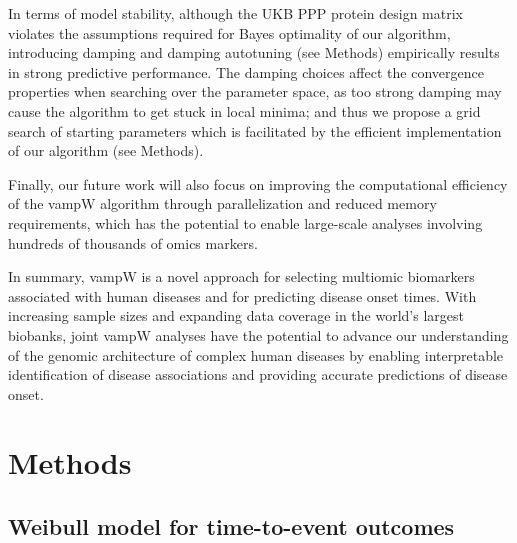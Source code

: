 In terms of model stability, although the UKB PPP protein design matrix violates the assumptions required for Bayes optimality of our algorithm, introducing damping and damping autotuning (see Methods) empirically results in strong predictive performance. The damping choices affect the convergence properties when searching over the parameter space, as too strong damping may cause the algorithm to get stuck in local minima; and thus we propose a grid search of starting parameters which is facilitated by the efficient implementation of our algorithm (see Methods). 



Finally, our future work will also focus on improving the computational efficiency of the vampW algorithm through parallelization and reduced memory requirements, which has the potential to enable large-scale analyses involving hundreds of thousands of omics markers.  

In summary, vampW is a novel approach for selecting multiomic biomarkers associated with human diseases and for predicting disease onset times. With increasing sample sizes and expanding data coverage in the world’s largest biobanks, joint vampW analyses have the potential to advance our understanding of the genomic architecture of complex human diseases by enabling interpretable identification of disease associations and providing accurate predictions of disease onset.

\section{Methods}
\subsection{Weibull model for time-to-event outcomes}\label{subsec:W}

